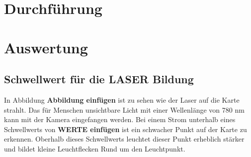 







\section{Durchführung}



\section{Auswertung}

\subsection{Schwellwert für die LASER Bildung}
In Abbildung \textbf{Abbildung einfügen} ist zu sehen wie der Laser auf die Karte strahlt.
Das für Menschen unsichtbare Licht mit einer Wellenlänge von 780 nm kann mit der Kamera eingefangen werden. %
Bei einem Strom unterhalb eines Schwellwerts von \textbf{WERTE einfügen} ist ein schwacher Punkt auf der Karte zu erkennen.
Oberhalb dieses Schwellwerts leuchtet dieser Punkt erheblich stärker und bildet kleine Leuchtflecken Rund um den Leuchtpunkt.


